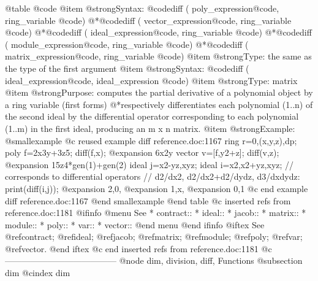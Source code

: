 @table @code
@item @strong{Syntax:}
@code{diff (} poly_expression@code{,} ring_variable @code{)}
@*@code{diff (} vector_expression@code{,} ring_variable @code{)}
@*@code{diff (} ideal_expression@code{,} ring_variable @code{)}
@*@code{diff (} module_expression@code{,} ring_variable @code{)}
@*@code{diff (} matrix_expression@code{,} ring_variable @code{)}
@item @strong{Type:}
the same as the type of the first argument
@item @strong{Syntax:}
@code{diff (} ideal_expression@code{,} ideal_expression @code{)}
@item @strong{Type:}
matrix
@item @strong{Purpose:}
computes the partial derivative of a polynomial object by a ring variable
(first forms)
@*respectively differentiates each polynomial (1..n) of the second ideal
by the differential operator corresponding to each polynomial (1..m) in the first
ideal, producing an m x n matrix.
@item @strong{Example:}
@smallexample
@c reused example diff reference.doc:1167 
  ring r=0,(x,y,z),dp;
  poly f=2x3y+3z5;
  diff(f,x);
@expansion{} 6x2y
  vector v=[f,y2+z];
  diff(v,z);
@expansion{} 15z4*gen(1)+gen(2)
  ideal j=x2-yz,xyz;
  ideal i=x2,x2+yz,xyz;
  // corresponds to differential operators
  // d2/dx2, d2/dx2+d2/dydz, d3/dxdydz:
  print(diff(i,j));
@expansion{} 2,0,
@expansion{} 1,x,
@expansion{} 0,1 
@c end example diff reference.doc:1167
@end smallexample
@end table
@c inserted refs from reference.doc:1181
@ifinfo
@menu
See
* contract::
* ideal::
* jacob::
* matrix::
* module::
* poly::
* var::
* vector::
@end menu
@end ifinfo
@iftex
See
@ref{contract};
@ref{ideal};
@ref{jacob};
@ref{matrix};
@ref{module};
@ref{poly};
@ref{var};
@ref{vector}.
@end iftex
@c end inserted refs from reference.doc:1181
@c ---------------------------------------
@node dim, division, diff, Functions
@subsection dim
@cindex dim

